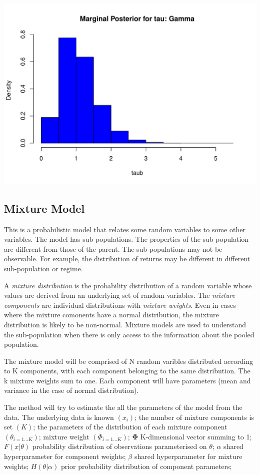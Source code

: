 \documentclass[12pt, a4paper, oneside]{article} %
\begin{document}
\begin{knitrout}
\includegraphics[width=\maxwidth]{figure/MCMCplot2} 

\end{knitrout}


\subsection{Mixture Model}
This is a probabilistic model that relates some random variables to some other variables.  The model has sub-populations. The properties of the sub-population are different from those of the parent. The sub-populations may not be observable.  For example, the distribution of returns may be different in different sub-population or regime. 

A \emph{mixture distribution} is the probability distribution of a random variable  whose values are derived from an underlying set of random variables. The \emph{mixture components} are individual distributions with \emph{mixture weights}.  Even in cases where the mixture comonents have a normal distribution, the mixture distribution is likely to be non-normal. Mixture models are used to understand the sub-population when there is only access to the information about the pooled population. 

The mixture model will be comprised of N random varibles distributed according to K components, with each component belonging to the same distribution. The k mixture weights sum to one. Each component will have parameters (mean and variance in the case of normal distribution).  

The method will try to estimate the all the parameters of the model from the data.  The underlying data is known $(x_i)$; the number of mixture components is set $(K)$; the parameters of the distribution of each mixture component $(\theta_{i=1\dots K})$; mixture weight $(\Phi_{i = 1\dots K})$; $\mathbf{\Phi}$ K-dimensional vector summing to 1; $F(x|\theta)$ probability distribution of observations parameterised on $\theta$; $\alpha$ shared hyperparameter for component weights; $\beta$ shared hyperparameter for mixture weights; $H(\theta|\alpha)$ prior probability distribution of component parameters; 
\end{document}
